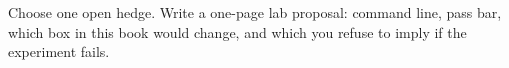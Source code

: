 \begin{exercise}
Choose one open hedge. Write a one-page lab proposal: command line, pass
bar, which box in this book would change, and which  you refuse to
imply if the experiment fails.
\end{exercise}

